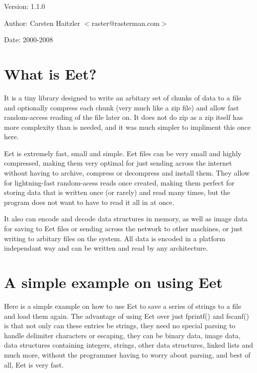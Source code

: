  \begin{Desc}
\item[Version:]1.1.0 \end{Desc}
\begin{Desc}
\item[Author:]Carsten Haitzler $<$raster@rasterman.com$>$ \end{Desc}
\begin{Desc}
\item[Date:]2000-2008\end{Desc}
\hypertarget{index_intro}{}\section{What is Eet?}\label{index_intro}
It is a tiny library designed to write an arbitary set of chunks of data to a file and optionally compress each chunk (very much like a zip file) and allow fast random-access reading of the file later on. It does not do zip as a zip itself has more complexity than is needed, and it was much simpler to impliment this once here.

Eet is extremely fast, small and simple. Eet files can be very small and highly compressed, making them very optimal for just sending across the internet without having to archive, compress or decompress and install them. They allow for lightning-fast random-acess reads once created, making them perfect for storing data that is written once (or rarely) and read many times, but the program does not want to have to read it all in at once.

It also can encode and decode data structures in memory, as well as image data for saving to Eet files or sending across the network to other machines, or just writing to arbitary files on the system. All data is encoded in a platform independant way and can be written and read by any architecture.\hypertarget{index_example}{}\section{A simple example on using Eet}\label{index_example}
Here is a simple example on how to use Eet to save a series of strings to a file and load them again. The advantage of using Eet over just fprintf() and fscanf() is that not only can these entries be strings, they need no special parsing to handle delimiter characters or escaping, they can be binary data, image data, data structures containing integers, strings, other data structures, linked lists and much more, without the programmer having to worry about parsing, and best of all, Eet is very fast.



